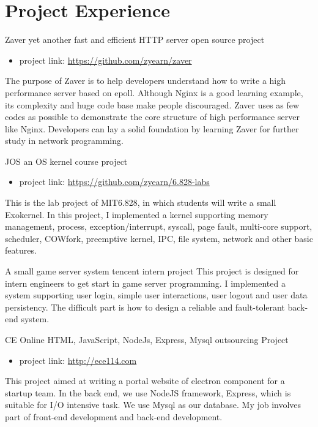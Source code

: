 \documentclass[11pt,a4paper]{moderncv}
\begin{document}
\section{Project Experience}
{Zaver}
{yet another fast and efficient HTTP server}
{open source project}
{}
{
\begin{itemize}
    \item project link: \url{https://github.com/zyearn/zaver}
\end{itemize}
The purpose of Zaver is to help developers understand how to write a high performance server based on epoll. Although Nginx is a good learning example, its complexity and huge code base make people discouraged. Zaver uses as few codes as possible to demonstrate the core structure of high performance server like Nginx. Developers can lay a solid foundation by learning Zaver for further study in network programming.
}
\vspace*{0.2\baselineskip}

{JOS}
{an OS kernel}
{course project}
{}
{
\begin{itemize}
    \item project link: \url{https://github.com/zyearn/6.828-labs}
\end{itemize}
This is the lab project of MIT6.828, in which students will write a small Exokernel. In this project, I implemented a kernel supporting memory management, process, exception/interrupt, syscall, page fault, multi-core support, scheduler, COWfork, preemptive kernel, IPC, file system, network and other basic features.
}
\vspace*{0.2\baselineskip}

{A small game server system}
{tencent intern project}
{}
{}
{
This project is designed for intern engineers to get start in game server programming. I implemented a system supporting user login, simple user interactions, user logout and user data persistency. The difficult part is how to design a reliable and fault-tolerant back-end system.
}
\vspace*{0.2\baselineskip}

{CE Online}
{HTML, JavaScript, NodeJs, Express, Mysql}
{outsourcing Project}
{}
{
\begin{itemize}
    \item project link: \url{http://ece114.com}
\end{itemize}
This project aimed at writing a portal website of electron component for a startup team. In the back end, we use NodeJS framework, Express, which is suitable for I/O intensive task. We use Mysql as our database. My job involves part of front-end development and back-end development.
}
\vspace*{0.2\baselineskip}
\end{document}
